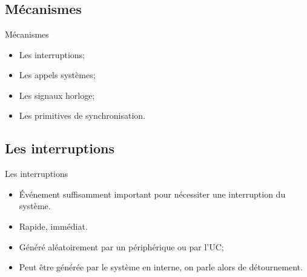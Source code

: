 \section{\sectitle}
\begin{frame}{\sectitle}

\def\subsectitle{Mécanismes}
\subsection{\subsectitle}

\begin{block}{\subsectitle}
\begin{itemize}
    \item Les interruptions;
    \item Les appels systèmes;
    \item Les signaux horloge;
    \item Les primitives de synchronisation.
\end{itemize}
\end{block}


\def\subsectitle{Les interruptions}
\subsection{\subsectitle}

\begin{block}{\subsectitle}
\begin{itemize}
    \item Événement suffisamment important pour nécessiter une interruption du
    système.
    \item Rapide, immédiat.
    \item Généré aléatoirement par un périphérique ou par l'UC;
    \item Peut être générée par le système en interne, on parle alors de
    détournement.
\end{itemize}
\end{block}
\end{frame}


